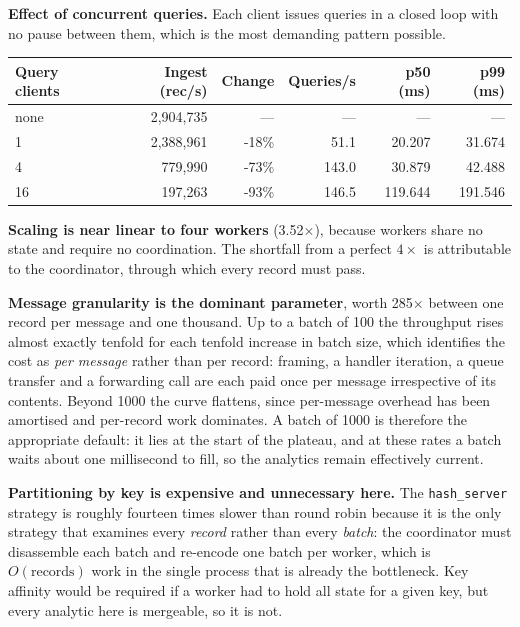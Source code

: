 \documentclass[11pt,a4paper]{article}
\begin{document}
\textbf{Effect of concurrent queries.} Each client issues queries in a closed loop with
no pause between them, which is the most demanding pattern possible.
\begin{center}\small
\begin{tabular}{@{}lrrrrr@{}}
\toprule
\textbf{Query clients} & \textbf{Ingest (rec/s)} & \textbf{Change} & \textbf{Queries/s} & \textbf{p50 (ms)} & \textbf{p99 (ms)} \\ \midrule
none & 2,904,735 & --- & --- & --- & --- \\
1 & 2,388,961 & -18\% & 51.1 & 20.207 & 31.674 \\
4 & 779,990 & -73\% & 143.0 & 30.879 & 42.488 \\
16 & 197,263 & -93\% & 146.5 & 119.644 & 191.546 \\
\bottomrule
\end{tabular}
\end{center}

\textbf{Scaling is near linear to four workers} (3.52$\times$), because workers
share no state and require no coordination. The shortfall from a perfect $4\times$ is
attributable to the coordinator, through which every record must pass.

\textbf{Message granularity is the dominant parameter}, worth 285$\times$
between one record per message and one thousand. Up to a batch of 100 the throughput
rises almost exactly tenfold for each tenfold increase in batch size, which identifies
the cost as \emph{per message} rather than per record: framing, a handler iteration, a
queue transfer and a forwarding call are each paid once per message irrespective of its
contents. Beyond 1000 the curve flattens, since per-message overhead has been amortised
and per-record work dominates. A batch of 1000 is therefore the appropriate default: it
lies at the start of the plateau, and at these rates a batch waits about one millisecond
to fill, so the analytics remain effectively current.

\textbf{Partitioning by key is expensive and unnecessary here.} The
\texttt{hash\_server} strategy is roughly fourteen times slower than round robin because
it is the only strategy that examines every \emph{record} rather than every
\emph{batch}: the coordinator must disassemble each batch and re-encode one batch per
worker, which is $O(\text{records})$ work in the single process that is already the
bottleneck. Key affinity would be required if a worker had to hold all state for a given
key, but every analytic here is mergeable, so it is not.
\end{document}
